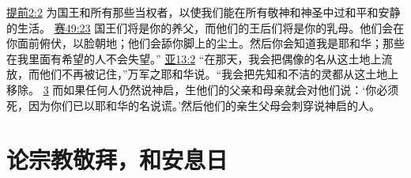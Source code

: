 \documentclass[12pt, a4paper, oneside]{ctexart}
\begin{document}
{		\href{https://biblehub.com/1_timothy/2-2.htm}{提前2:2} 为国王和所有那些当权者，以使我们能在所有敬神和神圣中过和平和安静的生活。
		\href{https://biblehub.com/isaiah/49-23.htm}{赛49:23} 国王们将是你的养父，而他们的王后们将是你的乳母。他们会在你面前俯伏，以脸朝地；他们会舔你脚上的尘土。然后你会知道我是耶和华；那些在我里面有希望的人不会失望。”
		\href{https://biblehub.com/zechariah/13-2.htm}{亚13:2} “在那天，我会把偶像的名从这土地上流放，而他们不再被记住，”万军之耶和华说。“我会把先知和不洁的灵都从这土地上移除。
		\href{https://biblehub.com/zechariah/13-3.htm}{3} 而如果任何人仍然说神启，生他们的父亲和母亲就会对他们说：‘你必须死，因为你们已以耶和华的名说谎。’然后他们的亲生父母会刺穿说神启的人。
	}

\section{论宗教敬拜，和安息日}
\end{document}
